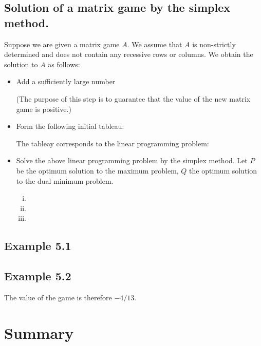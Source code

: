 \documentclass[]{report}
\begin{document}
\subsection{Solution of a matrix game by the simplex method.}
Suppose we are given a matrix game $A$. We assume that $A$ is non-strictly determined and does not contain any 
recessive rows or columns. We obtain the solution to $A$ as follows:
\begin{itemize}
\item[(1)] Add a sufficiently large number

(The purpose of this step is to guarantee that the value of the new matrix game is positive.)
\item[(2)] Form the following initial tableau:

The tableay corresponds to the linear programming problem:

\item[(3)] Solve the above linear programming problem by the simplex method. Let $P$ be the
optimum solution to the maximum problem, $Q$ the optimum solution to the dual minimum problem.

\begin{multicols}{3}
\begin{enumerate}[(i)]

\item
\item
\item
\end{enumerate}
\end{multicols}
\end{itemize}

\subsection*{Example 5.1}

\subsection*{Example 5.2}


The value of the game is therefore $-4/13$.


\section{Summary}
\end{document}
